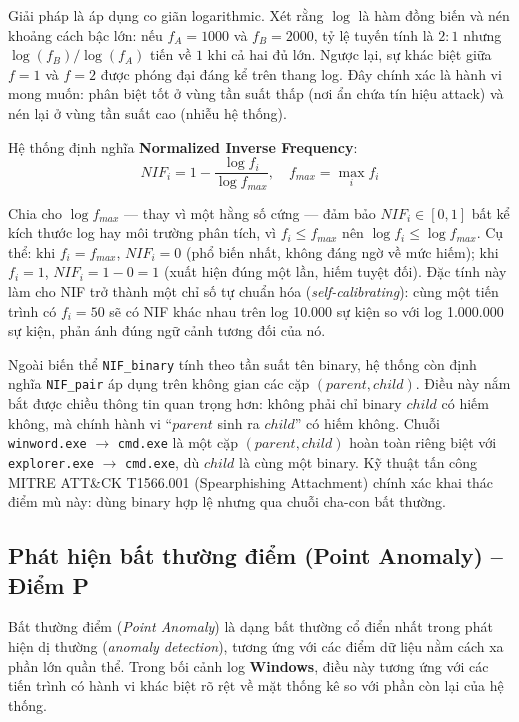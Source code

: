 \documentclass[../main.tex]{subfiles}
\begin{document}
Giải pháp là áp dụng co giãn logarithmic. Xét rằng $\log$ là hàm đồng biến và nén khoảng cách bậc lớn: nếu $f_A = 1000$ và $f_B = 2000$, tỷ lệ tuyến tính là $2:1$ nhưng $\log(f_B)/\log(f_A)$ tiến về $1$ khi cả hai đủ lớn. Ngược lại, sự khác biệt giữa $f = 1$ và $f = 2$ được phóng đại đáng kể trên thang log. Đây chính xác là hành vi mong muốn: phân biệt tốt ở vùng tần suất thấp (nơi ẩn chứa tín hiệu attack) và nén lại ở vùng tần suất cao (nhiễu hệ thống).

Hệ thống định nghĩa \textbf{Normalized Inverse Frequency}:
\begin{equation}
    NIF_i = 1 - \frac{\log f_i}{\log f_{max}}, \quad f_{max} = \max_i f_i \tag{1.5}
\end{equation}

Chia cho $\log f_{max}$ — thay vì một hằng số cứng — đảm bảo $NIF_i \in [0,1]$ bất kể kích thước log hay môi trường phân tích, vì $f_i \le f_{max}$ nên $\log f_i \le \log f_{max}$. Cụ thể: khi $f_i = f_{max}$, $NIF_i = 0$ (phổ biến nhất, không đáng ngờ về mức hiếm); khi $f_i = 1$, $NIF_i = 1 - 0 = 1$ (xuất hiện đúng một lần, hiếm tuyệt đối). Đặc tính này làm cho NIF trở thành một chỉ số tự chuẩn hóa (\textit{self-calibrating}): cùng một tiến trình có $f_i = 50$ sẽ có NIF khác nhau trên log 10.000 sự kiện so với log 1.000.000 sự kiện, phản ánh đúng ngữ cảnh tương đối của nó.

Ngoài biến thể \texttt{NIF\_binary} tính theo tần suất tên binary, hệ thống còn định nghĩa \texttt{NIF\_pair} áp dụng trên không gian các cặp $(parent, child)$. Điều này nắm bắt được chiều thông tin quan trọng hơn: không phải chỉ binary $child$ có hiếm không, mà chính hành vi ``$parent$ sinh ra $child$'' có hiếm không. Chuỗi \texttt{winword.exe} $\to$ \texttt{cmd.exe} là một cặp $(parent, child)$ hoàn toàn riêng biệt với \texttt{explorer.exe} $\to$ \texttt{cmd.exe}, dù $child$ là cùng một binary. Kỹ thuật tấn công MITRE ATT\&CK T1566.001 (Spearphishing Attachment) chính xác khai thác điểm mù này: dùng binary hợp lệ nhưng qua chuỗi cha-con bất thường.

\subsection{Phát hiện bất thường điểm (Point Anomaly) – Điểm P}
\label{subsection:2.4.2}
Bất thường điểm (\textit{Point Anomaly}) là dạng bất thường cổ điển nhất trong phát hiện dị thường (\textit{anomaly detection}), tương ứng với các điểm dữ liệu nằm cách xa phần lớn quần thể. Trong bối cảnh log \textbf{Windows}, điều này tương ứng với các tiến trình có hành vi khác biệt rõ rệt về mặt thống kê so với phần còn lại của hệ thống.
\end{document}
